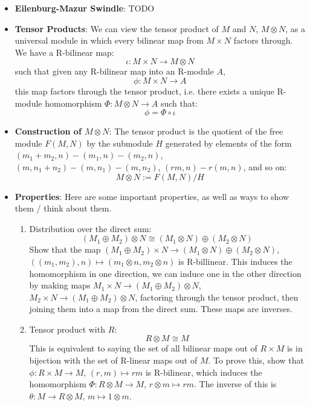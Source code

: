 \documentclass[11pt, oneside]{amsart}   	%
\theoremstyle{definition}
\begin{document}
\begin{itemize}

	\item \textbf{Eilenburg-Mazur Swindle}: TODO 

	\item \textbf{Tensor Products}: We can view the tensor product of $M$ and $N$, $M\otimes N$, as a universal module in which every bilinear map 
	from $M\times N$ factors through. We have a R-bilinear map:
	$$
		\iota : M\times N\rightarrow M\otimes N
	$$
	such that given any R-bilinear map into an R-module $A$,
	$$
		\phi : M\times N\rightarrow A
	$$
	this map factors through the tensor product, i.e. there exists a unique R-module homomorphism $\Phi : M\otimes N\rightarrow A$ such that:
	$$
		\phi = \Phi\circ\iota
	$$
	
	\item \textbf{Construction of $M\otimes N$}: The tensor product is the quotient of the free module $F(M, N)$ by the submodule $H$ generated by 
	elements of the form $(m_1 + m_2, n) - (m_1, n) - (m_2, n)$, $(m, n_1 + n_2) - (m, n_1) - (m, n_2)$, $(rm, n) - r(m, n)$, and so on:
	$$
		M\otimes N := F(M, N) / H
	$$
	
	\item \textbf{Properties}: Here are some important properties, as well as ways to show them / think about them.
	
		\begin{enumerate}
		
			\item Distribution over the direct sum:
			$$
				(M_1\oplus M_2)\otimes N\cong (M_1\otimes N)\oplus (M_2\otimes N)
			$$
			Show that the map $(M_1\oplus M_2)\times N\rightarrow (M_1\otimes N)\oplus (M_2\otimes N)$, $((m_1, m_2), n)\mapsto (m_1\otimes n, 
			m_2\otimes n)$ is R-billinear. This induces the homomorphism in one direction, we can induce one in the other direction by making maps 
			$M_1\times N\rightarrow (M_1\oplus M_2)\otimes N$, $M_2\times N\rightarrow (M_1\oplus M_2)\otimes N$, factoring through the tensor 
			product, then joining them into a map from the direct sum. These maps are inverses.
			
			\item Tensor product with $R$:
			$$
				R\otimes M\cong M
			$$
			This is equivalent to saying the set of all bilinear maps out of $R\times M$ is in bijection with the set of R-linear maps out of $M$. To prove 
			this, show that $\phi : R\times M\rightarrow M$, $(r, m)\mapsto rm$ is R-bilinear, which induces the homomorphism $\Phi: R\otimes M
			\rightarrow M$, $r\otimes m\mapsto rm$. The inverse of this is $\theta : M\rightarrow R\otimes M$, $m\mapsto 1\otimes m$.
			

\end{enumerate}
\end{itemize}
\end{document}
